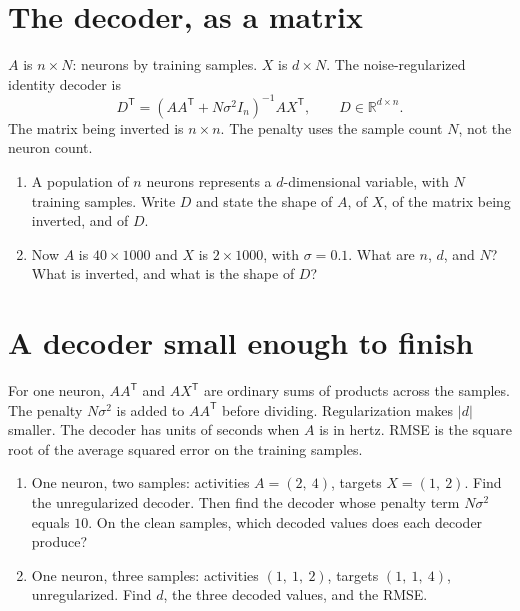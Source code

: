 \documentclass[11pt,letterpaper]{article}
\newcommand{\T}{\mathsf{T}}
\begin{document}
\section{The decoder, as a matrix}

\begin{idea}
$A$ is $n \times N$: neurons by training samples. $X$ is $d \times N$. The noise-regularized identity decoder is
\[
D^{\T} = (AA^{\T} + N\sigma^2 I_n)^{-1} A X^{\T}, \qquad D \in \mathbb{R}^{d \times n}.
\]
The matrix being inverted is $n \times n$. The penalty uses the sample count $N$, not the neuron count.
\end{idea}

\begin{enumerate}
\item A population of $n$ neurons represents a $d$-dimensional variable, with $N$ training samples. Write $D$ and state the shape of $A$, of $X$, of the matrix being inverted, and of $D$.
\item Now $A$ is $40 \times 1000$ and $X$ is $2 \times 1000$, with $\sigma = 0.1$. What are $n$, $d$, and $N$? What is inverted, and what is the shape of $D$?
\end{enumerate}

\section{A decoder small enough to finish}

\begin{idea}
For one neuron, $AA^{\T}$ and $AX^{\T}$ are ordinary sums of products across the samples. The penalty $N\sigma^2$ is added to $AA^{\T}$ before dividing. Regularization makes $|d|$ smaller. The decoder has units of seconds when $A$ is in hertz. RMSE is the square root of the average squared error on the training samples.
\end{idea}

\begin{enumerate}
\item One neuron, two samples: activities $A = (2,\ 4)$, targets $X = (1,\ 2)$. Find the unregularized decoder. Then find the decoder whose penalty term $N\sigma^2$ equals $10$. On the clean samples, which decoded values does each decoder produce?
\item One neuron, three samples: activities $(1,\ 1,\ 2)$, targets $(1,\ 1,\ 4)$, unregularized. Find $d$, the three decoded values, and the RMSE.
\end{enumerate}
\end{document}
